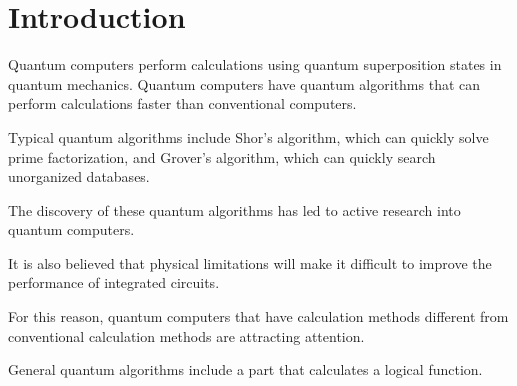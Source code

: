 \section{Introduction}

Quantum computers perform calculations using quantum superposition states in quantum mechanics\cite{nielsen2010quantum}.
Quantum computers have quantum algorithms that can perform calculations faster than conventional computers.

Typical quantum algorithms include Shor's algorithm\cite{shor1999polynomial}, which can quickly solve prime factorization, and Grover's algorithm\cite{grover1996fast}, which can quickly search unorganized databases.

The discovery of these quantum algorithms has led to active research into quantum computers.

It is also believed that physical limitations will make it difficult to improve the performance of integrated circuits\cite{2015Inte81:online}.

For this reason, quantum computers that have calculation methods different from conventional calculation methods are attracting attention.

\par

General quantum algorithms include a part that calculates a logical function\cite{yamashita2008ddmf}.

